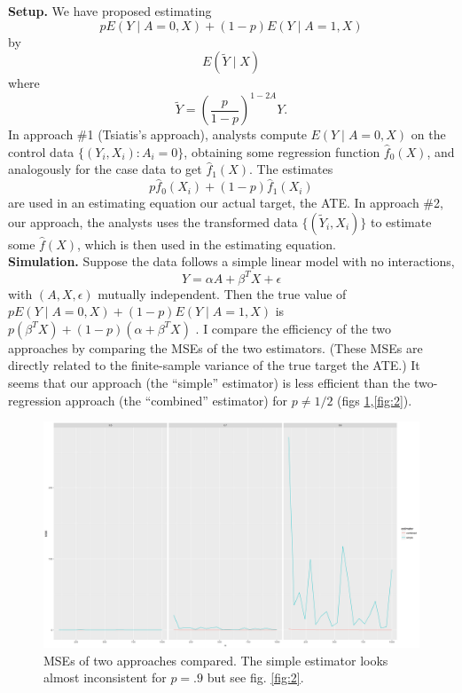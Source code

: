 \documentclass[10pt,a4paper]{amsart}
\newcommand{\EE}{E}
\newcommand{\E}[1]{\EE(Y\mid A=#1,X)}
\begin{document}
\noindent\textbf{Setup.} We have proposed estimating
\[
  p\E0 + (1-p)\E1
  \]
  by
  \[
    \EE(\tilde{Y}\mid X)
  \]
  where
  \[
    \tilde{Y} = \left(\frac{p}{1-p}\right)^{1-2A}Y.
    \]
In approach \#1 (Tsiatis's approach), analysts compute $\E0$ on the
control data $\{(Y_i,X_i): A_i=0\}$, obtaining some regression
function $\hat{f}_0(X)$, and analogously for the case data to get
$\hat{f}_1(X)$. The estimates
\[
  p\hat{f}_0(X_i) + (1-p)\hat{f}_1(X_i)
\]
are used in an estimating equation our actual target, the ATE. In
approach \#2, our
approach, the analysts uses the transformed data
$\{(\tilde{Y}_i,X_i)\}$ to estimate some $\hat{f}(X)$, which is then
used in the estimating equation.\\

\noindent\textbf{Simulation.} Suppose the data follows a simple linear
model with no interactions,
\[
  Y = \alpha A + \beta^T X + \epsilon
\]
with $(A,X,\epsilon)$ mutually independent. Then the true value of
$p\E0 + (1-p)\E1$ is $p(\beta^TX)+(1-p)(\alpha+\beta^TX)$ . I compare the efficiency of the two
approaches by comparing the MSEs of the two estimators. (These MSEs are
directly related to the finite-sample variance of the true target the ATE.) It seems that
our approach (the ``simple'' estimator) is less efficient than the
two-regression approach (the ``combined'' estimator) for $p\neq 1/2$
(figs \ref{fig:1},\ref{fig:2}).
\begin{figure}[h!]
  \includegraphics[width=\linewidth]{041118a.png}
  \caption{MSEs of two approaches compared. The simple estimator looks
  almost inconsistent for $p=.9$ but see fig. \ref{fig:2}.}  \label{fig:1}
\end{figure}
\end{document}
